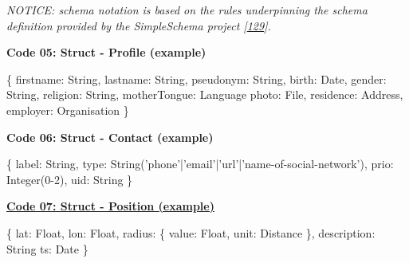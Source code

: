 \documentclass[12pt,english,a4paper,titlepage,cleardoublepage=empty,dottedtoc]{report}
\newenvironment{Shaded}{}{}
\newcommand{\DataTypeTok}[1]{\textcolor[rgb]{0.56,0.13,0.00}{{#1}}}
\newcommand{\DecValTok}[1]{\textcolor[rgb]{0.25,0.63,0.44}{{#1}}}
\newcommand{\StringTok}[1]{\textcolor[rgb]{0.25,0.44,0.63}{{#1}}}
\newcommand{\OperatorTok}[1]{\textcolor[rgb]{0.40,0.40,0.40}{{#1}}}
\newcommand{\AttributeTok}[1]{\textcolor[rgb]{0.49,0.56,0.16}{{#1}}}
\newcommand{\NormalTok}[1]{{#1}}
\begin{document}
\emph{NOTICE: schema notation is based on the rules underpinning the
schema definition provided by the SimpleSchema project
{[}\protect\hyperlink{ref-web_2017_repo_node-simple-schema}{129}{]}.}

\textbf{\protect\hypertarget{code-05_struct_profile}{}{Code 05: Struct -
Profile (example)}}

\begin{Shaded}
\begin{Highlighting}[]
\OperatorTok{\{}
    \DataTypeTok{firstname}\OperatorTok{:} \NormalTok{String}\OperatorTok{,}
    \DataTypeTok{lastname}\OperatorTok{:} \NormalTok{String}\OperatorTok{,}
    \DataTypeTok{pseudonym}\OperatorTok{:} \NormalTok{String}\OperatorTok{,}
    \DataTypeTok{birth}\OperatorTok{:} \NormalTok{Date}\OperatorTok{,}
    \DataTypeTok{gender}\OperatorTok{:} \NormalTok{String}\OperatorTok{,}
    \DataTypeTok{religion}\OperatorTok{:} \NormalTok{String}\OperatorTok{,}
    \DataTypeTok{motherTongue}\OperatorTok{:} \NormalTok{Language}
    \DataTypeTok{photo}\OperatorTok{:} \NormalTok{File}\OperatorTok{,}
    \DataTypeTok{residence}\OperatorTok{:} \NormalTok{Address}\OperatorTok{,}
    \DataTypeTok{employer}\OperatorTok{:} \NormalTok{Organisation}
\OperatorTok{\}}
\end{Highlighting}
\end{Shaded}

\textbf{\protect\hypertarget{code-06_struct_contact}{}{Code 06: Struct -
Contact (example)}}

\begin{Shaded}
\begin{Highlighting}[]
\OperatorTok{\{}
    \DataTypeTok{label}\OperatorTok{:} \NormalTok{String}\OperatorTok{,}
    \DataTypeTok{type}\OperatorTok{:} \AttributeTok{String}\NormalTok{(}\StringTok{'phone'}\OperatorTok{|}\StringTok{'email'}\OperatorTok{|}\StringTok{'url'}\OperatorTok{|}\StringTok{'name-of-social-network'}\NormalTok{)}\OperatorTok{,}
    \DataTypeTok{prio}\OperatorTok{:} \AttributeTok{Integer}\NormalTok{(}\DecValTok{0-2}\NormalTok{)}\OperatorTok{,}
    \DataTypeTok{uid}\OperatorTok{:} \NormalTok{String}
\OperatorTok{\}}
\end{Highlighting}
\end{Shaded}

\textbf{\protect\hyperlink{code-07_struct_position}{Code 07: Struct -
Position (example)}}

\begin{Shaded}
\begin{Highlighting}[]
\OperatorTok{\{}
    \DataTypeTok{lat}\OperatorTok{:} \NormalTok{Float}\OperatorTok{,}
    \DataTypeTok{lon}\OperatorTok{:} \NormalTok{Float}\OperatorTok{,}
    \DataTypeTok{radius}\OperatorTok{:} \OperatorTok{\{}
        \DataTypeTok{value}\OperatorTok{:} \NormalTok{Float}\OperatorTok{,}
        \DataTypeTok{unit}\OperatorTok{:} \NormalTok{Distance}
    \OperatorTok{\},}
    \DataTypeTok{description}\OperatorTok{:} \NormalTok{String}
    \DataTypeTok{ts}\OperatorTok{:} \NormalTok{Date}
\OperatorTok{\}}
\end{Highlighting}
\end{Shaded}
\end{document}
